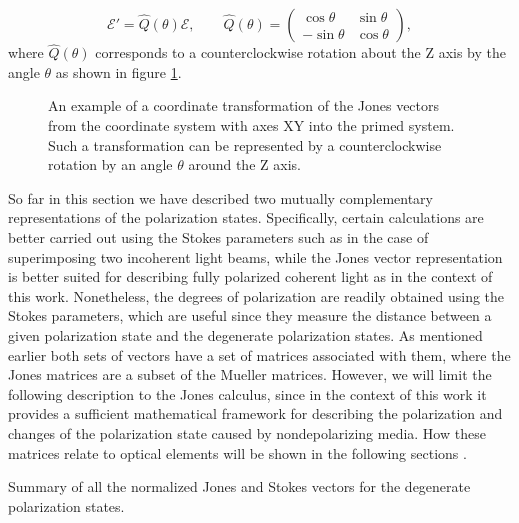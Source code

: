 \begin{equation}
    \label{eq:jones_vector_transformation}
    \bm{\mathcal{E}}' = \hat{Q}(\theta) \bm{\mathcal{E}}, \qquad
    \hat{Q}(\theta) =
    \begin{pmatrix}
    \cos \theta & \sin \theta \\
    -\sin \theta & \cos \theta
    \end{pmatrix},
\end{equation}
where $\hat{Q}(\theta)$ corresponds to a counterclockwise rotation about the Z axis by the angle $\theta$ as shown in figure \ref{fig:frame_rotation}. 

\begin{figure}[h]
    \centering
    
    \caption{An example of a coordinate transformation of the Jones vectors from the coordinate system with axes XY into the primed system. Such a transformation can be represented by a counterclockwise rotation by an angle $\theta$ around the Z axis.}
    \label{fig:frame_rotation}
\end{figure}

So far in this section we have described two mutually complementary representations of the polarization states. Specifically, certain calculations are better carried out using the Stokes parameters such as in the case of superimposing two incoherent light beams, while the Jones vector representation is better suited for describing fully polarized coherent light as in the context of this work. Nonetheless, the degrees of polarization are readily obtained using the Stokes parameters, which are useful since they measure the distance between a given polarization state and the degenerate polarization states. As mentioned earlier both sets of vectors have a set of matrices associated with them, where the Jones matrices are a subset of the Mueller matrices. However, we will limit the following description to the Jones calculus, since in the context of this work it provides a sufficient mathematical framework for describing the polarization and changes of the polarization state caused by nondepolarizing media. How these matrices relate to optical elements will be shown in the following sections \cite{HechtOpticsEdition, GilPerez2017PolarizedApproach}.

\newpage

\begin{table}[H]
    \centering
    
    \caption{Summary of all the normalized Jones and Stokes vectors for the degenerate polarization states.}
    \label{tab:pol_statevectors}
\end{table}

